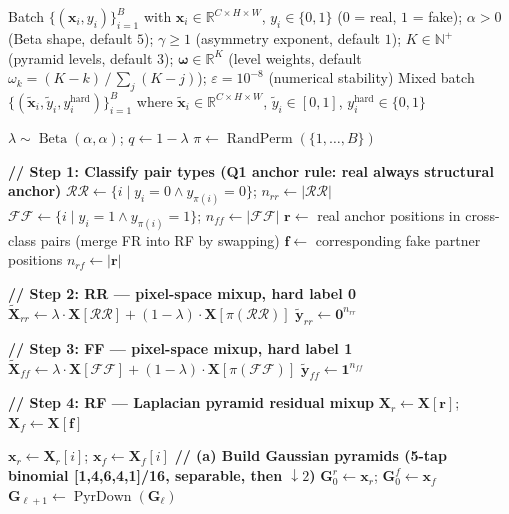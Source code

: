 \documentclass[12pt]{article}
\begin{document}
\clearpage
\begin{algorithm}[p]
\caption{LapPyramidMixup \quad (\texttt{mixup\_mode = lap\_pyramid}, with v1 sampler)}
\label{alg:lap}
\begin{algorithmic}[1]\scriptsize
\Require
  Batch $\{(\mathbf{x}_i, y_i)\}_{i=1}^{B}$ with $\mathbf{x}_i \in \mathbb{R}^{C \times H \times W}$, $y_i \in \{0,1\}$ ($0$ = real, $1$ = fake);
  $\alpha > 0$ (Beta shape, default $5$); $\gamma \ge 1$ (asymmetry exponent, default $1$);
  $K \in \mathbb{N}^+$ (pyramid levels, default $3$);
  $\bm{\omega} \in \mathbb{R}^{K}$ (level weights, default $\omega_k = (K - k)\,/\,\sum_j (K - j)$);
  $\varepsilon = 10^{-8}$ (numerical stability)
\Ensure
  Mixed batch $\{(\tilde{\mathbf{x}}_i, \tilde{y}_i, y^{\text{hard}}_i)\}_{i=1}^{B}$ where
  $\tilde{\mathbf{x}}_i \in \mathbb{R}^{C \times H \times W}$, $\tilde{y}_i \in [0,1]$, $y^{\text{hard}}_i \in \{0,1\}$

\State $\lambda \sim \operatorname{Beta}(\alpha, \alpha)$; \quad $q \gets 1 - \lambda$ 
\State $\pi \gets \operatorname{RandPerm}(\{1,\dots,B\})$

\State \textbf{// Step 1: Classify pair types (Q1 anchor rule: real always structural anchor)}
\State $\mathcal{RR} \gets \{i \mid y_i = 0 \land y_{\pi(i)} = 0\}$; \quad $n_{rr} \gets |\mathcal{RR}|$
\State $\mathcal{FF} \gets \{i \mid y_i = 1 \land y_{\pi(i)} = 1\}$; \quad $n_{ff} \gets |\mathcal{FF}|$
\State $\mathbf{r} \gets$ real anchor positions in cross-class pairs (merge FR into RF by swapping)
\State $\mathbf{f} \gets$ corresponding fake partner positions
\State $n_{rf} \gets |\mathbf{r}|$

\State \textbf{// Step 2: RR — pixel-space mixup, hard label 0}
\State $\tilde{\mathbf{X}}_{rr} \gets \lambda \cdot \mathbf{X}[\mathcal{RR}] + (1-\lambda) \cdot \mathbf{X}[\pi(\mathcal{RR})]$
\State $\tilde{\mathbf{y}}_{rr} \gets \mathbf{0}^{n_{rr}}$

\State \textbf{// Step 3: FF — pixel-space mixup, hard label 1}
\State $\tilde{\mathbf{X}}_{ff} \gets \lambda \cdot \mathbf{X}[\mathcal{FF}] + (1-\lambda) \cdot \mathbf{X}[\pi(\mathcal{FF})]$
\State $\tilde{\mathbf{y}}_{ff} \gets \mathbf{1}^{n_{ff}}$

\State \textbf{// Step 4: RF — Laplacian pyramid residual mixup}
  \State $\mathbf{X}_r \gets \mathbf{X}[\mathbf{r}]$; \quad $\mathbf{X}_f \gets \mathbf{X}[\mathbf{f}]$ 

   
    \State $\mathbf{x}_r \gets \mathbf{X}_r[i]$; \quad $\mathbf{x}_f \gets \mathbf{X}_f[i]$
    \State \textbf{// (a) Build Gaussian pyramids (5-tap binomial [1,4,6,4,1]/16, separable, then $\downarrow\!2$)}
    \State $\mathbf{G}_0^r \gets \mathbf{x}_r$; \quad $\mathbf{G}_0^f \gets \mathbf{x}_f$
      \State $\mathbf{G}_{\ell+1} \gets \operatorname{PyrDown}(\mathbf{G}_\ell)$
    \EndFor


\end{algorithmic}
\end{algorithm}
\end{document}
